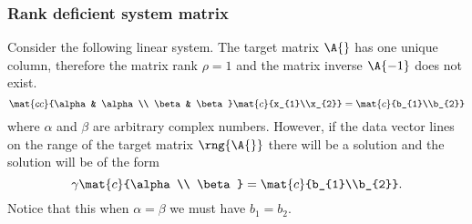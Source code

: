 \subsubsection{Rank deficient system matrix}
Consider the following linear system. The target matrix $\A{}$ has one unique column, therefore the matrix rank $\rho = 1$ and the matrix inverse $\A{-1}$ does not exist.
\begin{equation}
  \mat{cc}{\alpha & \alpha \\ \beta & \beta} \mat{c}{x_{1}\\x_{2}} = \mat{c}{b_{1}\\b_{2}}
\end{equation}
where $\alpha$ and $\beta$ are arbitrary complex numbers.
However, if the data vector lines on the range of the target matrix $\rng{\A{}}$ there will be a solution and the solution will be of the form
\begin{equation}
  \gamma \mat{c}{\alpha \\ \beta} = \mat{c}{b_{1}\\b_{2}}.
\end{equation}
Notice that this when $\alpha = \beta$ we must have $b_{1} = b_{2}$.




\endinput
